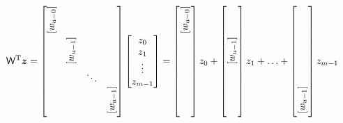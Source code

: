 \documentclass[preview,border=10pt]{standalone}
\begin{document}
\begin{equation*}
    \mathsf{W}^\text{T} \bm{z} =      
    \begin{bmatrix} 
        \rotatebox{90}{$[w_{u-0}]$}  \\
        & \rotatebox{90}{$[w_{u-1}]$} \\
        && \ddots  \\
        &&& \rotatebox{90}{$[w_{u-1}]$}
    \end{bmatrix} 
    \begin{bmatrix}
        z_{0} \\
        z_{1} \\
        \vdots   \\
        z_{m-1} \\
    \end{bmatrix}
    =    
    \begin{bmatrix} 
        {\rotatebox{90}{$[w_{u-0}]$}}  \\
        \phantom{\rotatebox{90}{$[w_{u-1}]$}} \\
        \phantom{\ddots}  \\
        \phantom{\rotatebox{90}{$[w_{u-1}]$}}
    \end{bmatrix} 
    z_0
    +
    \begin{bmatrix} 
        \phantom{\rotatebox{90}{$[w_{u-0}]$}} \\
        {\rotatebox{90}{$[w_{u-1}]$}} \\
        \phantom{\ddots}  \\
        \phantom{\rotatebox{90}{$[w_{u-1}]$}}
    \end{bmatrix} 
    z_1
    +
    \ldots 
    +
    \begin{bmatrix} 
        \phantom{\rotatebox{90}{$[w_{u-0}]$}} \\
        \phantom{\rotatebox{90}{$[w_{u-1}]$}} \\
        \phantom{\ddots}  \\
        {\rotatebox{90}{$[w_{u-1}]$}}
    \end{bmatrix} 
    z_{m-1}   
\end{equation*}
\end{document}
